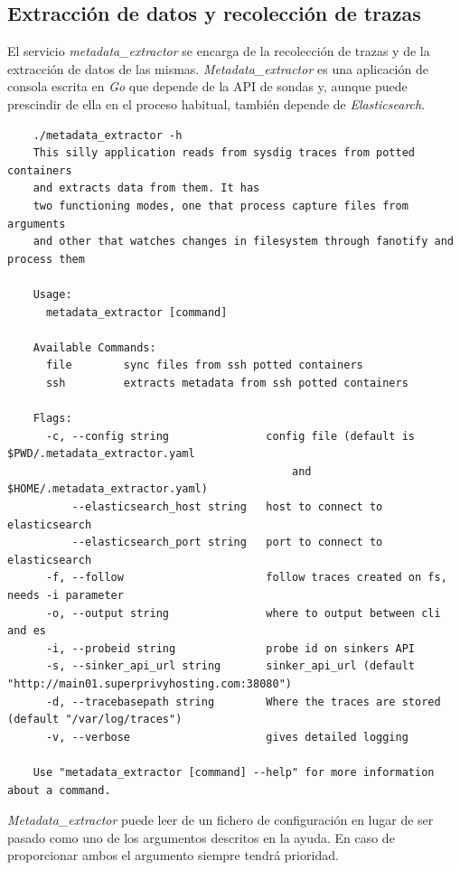 \subsection{Extracción de datos y recolección de trazas}
\label{subsec:extraccion-trazas}

El servicio \emph{metadata\_extractor} se encarga de la recolección de trazas y de la extracción de datos de las mismas.
\emph{Metadata\_extractor} es una aplicación de consola escrita en \emph{Go} que depende de la API de sondas y, aunque puede prescindir de ella
en el proceso habitual, también depende de \emph{Elasticsearch}.

\begin{verbatim}
    ./metadata_extractor -h
    This silly application reads from sysdig traces from potted containers 
    and extracts data from them. It has
    two functioning modes, one that process capture files from arguments 
    and other that watches changes in filesystem through fanotify and process them
    
    Usage:
      metadata_extractor [command]
    
    Available Commands:
      file        sync files from ssh potted containers
      ssh         extracts metadata from ssh potted containers
    
    Flags:
      -c, --config string               config file (default is $PWD/.metadata_extractor.yaml 
                                            and $HOME/.metadata_extractor.yaml)
          --elasticsearch_host string   host to connect to elasticsearch
          --elasticsearch_port string   port to connect to elasticsearch
      -f, --follow                      follow traces created on fs, needs -i parameter
      -o, --output string               where to output between cli and es
      -i, --probeid string              probe id on sinkers API
      -s, --sinker_api_url string       sinker_api_url (default "http://main01.superprivyhosting.com:38080")
      -d, --tracebasepath string        Where the traces are stored  (default "/var/log/traces")
      -v, --verbose                     gives detailed logging
    
    Use "metadata_extractor [command] --help" for more information about a command.
\end{verbatim}
\bigskip
\emph{Metadata\_extractor} puede leer de un fichero de configuración en lugar de ser pasado como uno de los argumentos descritos en la ayuda. En caso
de proporcionar ambos el argumento siempre tendrá prioridad.



